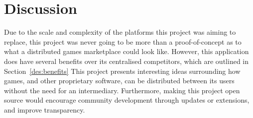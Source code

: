\section{Discussion}

Due to the scale and complexity of the platforms this project was aiming to replace, this project was never going to be more than a proof-of-concept as to what a distributed games marketplace could look like. 
However, this application does have several benefits over its centralised competitors, which are outlined in Section~\ref{des:benefits}
\x
This project presents interesting ideas surrounding how games, and other proprietary software, can be distributed between its users without the need for an intermediary. Furthermore, making this project open source would encourage community development through updates or extensions, and improve transparency. 
